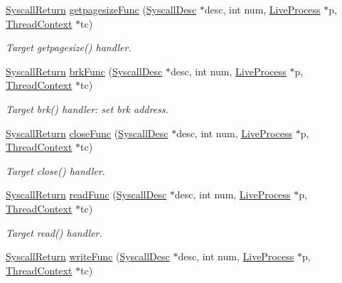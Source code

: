 \begin{DoxyCompactItemize}
\hyperlink{classSyscallReturn}{SyscallReturn} \hyperlink{syscall__emul_8hh_a5961ea78f5b078d3c0881362b6992b3a}{getpagesizeFunc} (\hyperlink{classSyscallDesc}{SyscallDesc} $\ast$desc, int num, \hyperlink{classLiveProcess}{LiveProcess} $\ast$p, \hyperlink{classThreadContext}{ThreadContext} $\ast$tc)
\begin{DoxyCompactList}\small\item\em Target getpagesize() handler. \item\end{DoxyCompactList}\item 
\hyperlink{classSyscallReturn}{SyscallReturn} \hyperlink{syscall__emul_8hh_aacb64b1e0489626a0c931f076d2f4f31}{brkFunc} (\hyperlink{classSyscallDesc}{SyscallDesc} $\ast$desc, int num, \hyperlink{classLiveProcess}{LiveProcess} $\ast$p, \hyperlink{classThreadContext}{ThreadContext} $\ast$tc)
\begin{DoxyCompactList}\small\item\em Target brk() handler: set brk address. \item\end{DoxyCompactList}\item 
\hyperlink{classSyscallReturn}{SyscallReturn} \hyperlink{syscall__emul_8hh_a1cd0dfa0a5c6e64cc402c1a17fe6a86d}{closeFunc} (\hyperlink{classSyscallDesc}{SyscallDesc} $\ast$desc, int num, \hyperlink{classLiveProcess}{LiveProcess} $\ast$p, \hyperlink{classThreadContext}{ThreadContext} $\ast$tc)
\begin{DoxyCompactList}\small\item\em Target close() handler. \item\end{DoxyCompactList}\item 
\hyperlink{classSyscallReturn}{SyscallReturn} \hyperlink{syscall__emul_8hh_a5cb187a0afcfb802a06396f382fe5ada}{readFunc} (\hyperlink{classSyscallDesc}{SyscallDesc} $\ast$desc, int num, \hyperlink{classLiveProcess}{LiveProcess} $\ast$p, \hyperlink{classThreadContext}{ThreadContext} $\ast$tc)
\begin{DoxyCompactList}\small\item\em Target read() handler. \item\end{DoxyCompactList}\item 
\hyperlink{classSyscallReturn}{SyscallReturn} \hyperlink{syscall__emul_8hh_a0d5b24a5c07baeac543de44989b73d43}{writeFunc} (\hyperlink{classSyscallDesc}{SyscallDesc} $\ast$desc, int num, \hyperlink{classLiveProcess}{LiveProcess} $\ast$p, \hyperlink{classThreadContext}{ThreadContext} $\ast$tc)

\end{DoxyCompactItemize}
